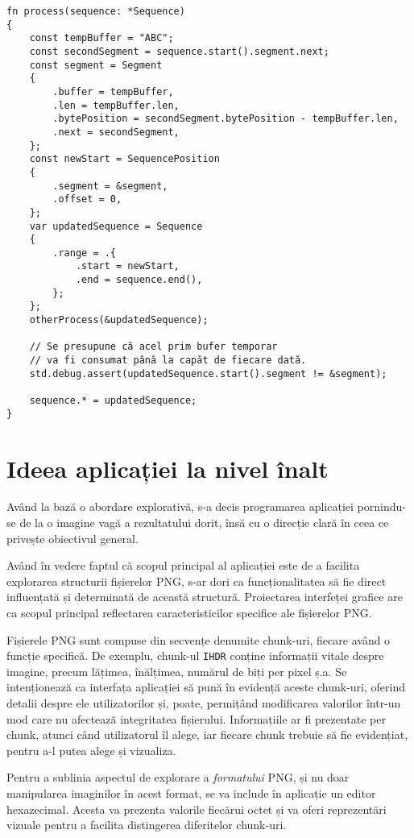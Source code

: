 \documentclass[a4paper,12pt]{report}
\begin{document}
\begin{verbatim}
fn process(sequence: *Sequence)
{
    const tempBuffer = "ABC";
    const secondSegment = sequence.start().segment.next;
    const segment = Segment
    {
        .buffer = tempBuffer,
        .len = tempBuffer.len,
        .bytePosition = secondSegment.bytePosition - tempBuffer.len,
        .next = secondSegment,
    };
    const newStart = SequencePosition
    {
        .segment = &segment,
        .offset = 0,
    };
    var updatedSequence = Sequence
    {
        .range = .{
            .start = newStart,
            .end = sequence.end(),
        };
    };
    otherProcess(&updatedSequence);

    // Se presupune că acel prim bufer temporar
    // va fi consumat până la capăt de fiecare dată.
    std.debug.assert(updatedSequence.start().segment != &segment);

    sequence.* = updatedSequence;
}
\end{verbatim}

\section{Ideea aplicației la nivel înalt}

Având la bază o abordare explorativă, s-a decis programarea aplicației
pornindu-se de la o imagine vagă a rezultatului dorit,
însă cu o direcție clară în ceea ce privește obiectivul general.

Având în vedere faptul că scopul principal al aplicației
este de a facilita explorarea structurii fișierelor \ac{PNG},
s-ar dori ca funcționalitatea să fie direct
influențată și determinată de această structură.
Proiectarea interfeței grafice are ca scopul principal reflectarea
caracteristicilor specifice ale fișierelor \ac{PNG}.

Fișierele \ac{PNG} sunt compuse din secvențe denumite chunk-uri,
fiecare având o funcție specifică.
De exemplu, chunk-ul \texttt{IHDR} conține informații vitale despre imagine,
precum lățimea, înălțimea, numărul de biți per pixel ș.a.
Se intenționează ca interfața aplicației să pună
în evidență aceste chunk-uri, oferind detalii despre ele utilizatorilor
și, poate, permițând modificarea valorilor într-un mod
care nu afectează integritatea fișierului.
Informațiile ar fi prezentate per chunk, atunci când utilizatorul îl alege,
iar fiecare chunk trebuie să fie evidențiat, pentru a-l putea alege și vizualiza.

Pentru a sublinia aspectul de explorare a \textit{formatului} \ac{PNG},
și nu doar manipularea imaginilor în acest format,
se va include în aplicație un editor hexazecimal.
Acesta va prezenta valorile fiecărui octet și
va oferi reprezentări vizuale pentru a facilita distingerea diferitelor chunk-uri.
\end{document}
